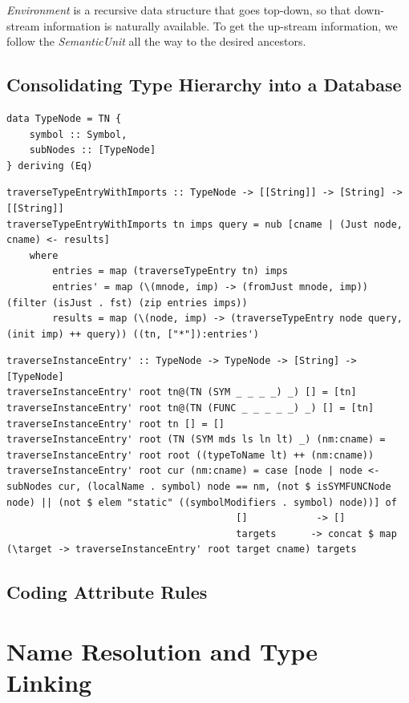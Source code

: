 \documentclass[12pt,letterpaper]{article}
\begin{document}
\emph{Environment} is a recursive data structure that goes top-down, so that down-stream information is naturally available. To get the up-stream information, we follow the \emph{SemanticUnit} all the way to the desired ancestors.

\subsection{Consolidating Type Hierarchy into a Database}
\begin{lstlisting}
data TypeNode = TN {
    symbol :: Symbol,
    subNodes :: [TypeNode]
} deriving (Eq)
\end{lstlisting}

\begin{lstlisting}
traverseTypeEntryWithImports :: TypeNode -> [[String]] -> [String] -> [[String]]
traverseTypeEntryWithImports tn imps query = nub [cname | (Just node, cname) <- results]
    where
        entries = map (traverseTypeEntry tn) imps
        entries' = map (\(mnode, imp) -> (fromJust mnode, imp)) (filter (isJust . fst) (zip entries imps))
        results = map (\(node, imp) -> (traverseTypeEntry node query, (init imp) ++ query)) ((tn, ["*"]):entries')
\end{lstlisting}

\begin{lstlisting}
traverseInstanceEntry' :: TypeNode -> TypeNode -> [String] -> [TypeNode]
traverseInstanceEntry' root tn@(TN (SYM _ _ _ _) _) [] = [tn]
traverseInstanceEntry' root tn@(TN (FUNC _ _ _ _ _) _) [] = [tn]
traverseInstanceEntry' root tn [] = []
traverseInstanceEntry' root (TN (SYM mds ls ln lt) _) (nm:cname) = traverseInstanceEntry' root root ((typeToName lt) ++ (nm:cname))
traverseInstanceEntry' root cur (nm:cname) = case [node | node <- subNodes cur, (localName . symbol) node == nm, (not $ isSYMFUNCNode node) || (not $ elem "static" ((symbolModifiers . symbol) node))] of
                                        []            -> []
                                        targets      -> concat $ map (\target -> traverseInstanceEntry' root target cname) targets
\end{lstlisting}

\subsection{Coding Attribute Rules}



\section{Name Resolution and Type Linking}
\end{document}
